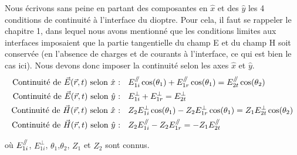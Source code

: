 Nous écrivons sans peine en partant des composantes en $\hat{x}$ et des $\hat{y}$ les 4 conditions de continuité à l'interface du dioptre. Pour cela, il faut se rappeler le chapitre 1, dans lequel nous avons mentionné que les conditions limites aux interfaces imposaient que la partie tangentielle du champ E et du champ H soit conservée (en l'absence de charges et de courants à l'interface, ce qui est bien le cas ici). Nous devons donc imposer la continuité selon les axes $\hat{x}$ et $\hat{y}$. %
\begin{equation*}
\begin{split}
\mbox{Continuité de $\vec{E}(\vec{r},t)$ selon $\hat{x}$ : }&\hspace{5pt} E^{\mathbin{/\mkern-5mu/}}_{1i} \cos(\theta_{1}) +E^{\mathbin{/\mkern-5mu/}}_{1r} \cos(\theta_{1}) = E^{\mathbin{/\mkern-5mu/}}_{2t} \cos(\theta_{2})\\
\mbox{Continuité de $\vec{E}(\vec{r},t)$ selon $\hat{y}$ : }&\hspace{5pt} E_{1i}^{\perp} + E_{1r}^{\perp} = E_{2t}^{\perp}  \\
\mbox{Continuité de $\vec{H}(\vec{r},t)$ selon $\hat{x}$ : }&\hspace{5pt} Z_2E^{\perp}_{1i}\cos(\theta_{1}) - Z_2E^{\perp}_{1r} \cos(\theta_{1}) = Z_1E^{\perp}_{2t} \cos(\theta_{2})   \\
\mbox{Continuité de $\vec{H}(\vec{r},t)$ selon $\hat{y}$ : }&\hspace{5pt} Z_2E^{\mathbin{/\mkern-5mu/}}_{1i} - Z_2E_{1r}^{\mathbin{/\mkern-5mu/}} = -Z_1E_{2t}^{\mathbin{/\mkern-5mu/}}
\end{split}
\end{equation*}
  
où $E_{1i}^{\mathbin{/\mkern-5mu/}}$, $E_{1i}^{\perp}$, $\theta_{1}$,$\theta_{2}$, $Z_1$ et $Z_2$ sont connus.

